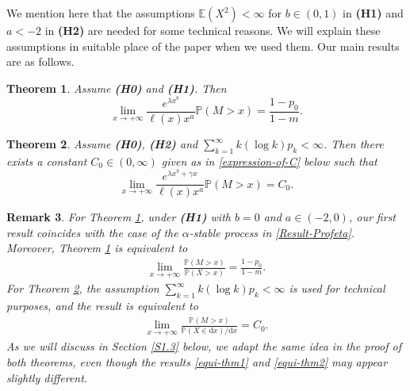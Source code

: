 \documentclass[11pt]{article}
\newtheorem{thrm}{Theorem}[section]
\newtheorem{remark}[thrm]{Remark}
\numberwithin{equation}{section}
\begin{document}
We mention here that the assumptions $\mathbb{E}(X^2)<\infty$  for $b\in (0,1)$ in {\bf(H1)}  and  $a<-2$ in {\bf(H2)} are needed for some technical reasons. We will explain these assumptions in suitable place  of the paper when we used them. 
Our main results are as follows. 


	\begin{thrm}\label{thm1}
		Assume {\bf(H0)} and {\bf(H1)}. Then 
		\[
		\lim_{x\to+\infty} \frac{e^{\lambda x^b}}{\ell(x)x^a } \mathbb{P}(M>x) =\frac{1-p_0}{1-m}. 
		\]
	\end{thrm}



	\begin{thrm}\label{thm2}
	Assume {\bf(H0)},  {\bf(H2)} and $\sum_{k=1}^\infty k(\log k)p_k<\infty$. Then there exists a constant $C_0\in (0,\infty)$ given as in \eqref{expression-of-C} below such that 
	\[
	\lim_{x\to+\infty} \frac{e^{\lambda x^b+ \gamma x}}{\ell(x) x^a }\mathbb{P}(M>x) =C_0. 
	\]
\end{thrm}

\begin{remark}
	  For Theorem \ref{thm1}, under {\bf(H1)} with $b = 0$ and $a \in (-2, 0)$, our first result coincides with the case of the $\alpha$-stable process in \eqref{Result-Profeta}. Moreover, Theorem \ref{thm1} is equivalent to
	  \begin{align}\label{equi-thm1}
	  	\lim_{x \to +\infty} \frac{\mathbb{P}(M > x)}{\mathbb{P}(X > x)} = \frac{1 - p_0}{1 - m}.
	  \end{align}
	  For Theorem \ref{thm2}, the assumption $\sum_{k=1}^\infty k (\log k) p_k < \infty$ is used for technical purposes, and the result is equivalent to
	  \begin{align}\label{equi-thm2}
	  	\lim_{x \to +\infty} \frac{\mathbb{P}(M > x)}{\mathbb{P}(X \in \mathrm{d}x) / \mathrm{d}x} = C_0.
	  \end{align}
	  As we will discuss in Section \ref{S1.3} below, we adapt the same idea in the proof of both theorems, even though the results \eqref{equi-thm1} and \eqref{equi-thm2} may appear slightly different.
\end{remark}
\end{document}

